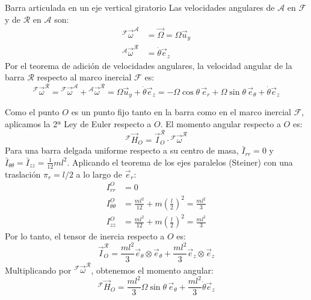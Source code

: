 \begin{solucion}{Barra articulada en un eje vertical giratorio}
Las velocidades angulares de $\mathcal{A}$ en $\mathcal{F}$ y de $\mathcal{R}$ en $\mathcal{A}$ son:
\begin{align}
    {}^{\mathcal{F}}\vec{\omega}^{\mathcal{A}} &= \vec{\Omega} = \Omega\vec{u}_y \\
    {}^{\mathcal{A}}\vec{\omega}^{\mathcal{R}} &= \dot{\theta}\vec{e}_z
\end{align}
Por el teorema de adición de velocidades angulares, la velocidad angular de la barra $\mathcal{R}$ respecto al marco inercial $\mathcal{F}$ es:
\begin{equation}
    {}^{\mathcal{F}}\vec{\omega}^{\mathcal{R}} = {}^{\mathcal{F}}\vec{\omega}^{\mathcal{A}} + {}^{\mathcal{A}}\vec{\omega}^{\mathcal{R}} = \Omega\vec{u}_y + \dot{\theta}\vec{e}_z = -\Omega\cos\theta\,\vec{e}_r + \Omega\sin\theta\,\vec{e}_\theta + \dot{\theta}\vec{e}_z
\end{equation}

Como el punto $O$ es un punto fijo tanto en la barra como en el marco inercial $\mathcal{F}$, aplicamos la 2ª Ley de Euler respecto a $O$. El momento angular respecto a $O$ es:
\begin{equation}
    {}^{\mathcal{F}}\vec{H}_O = \vec{I}_O^{\mathcal{R}} \cdot {}^{\mathcal{F}}\vec{\omega}^{\mathcal{R}}
\end{equation}
Para una barra delgada uniforme respecto a su centro de masa, $\bar{I}_{rr} = 0$ y $\bar{I}_{\theta\theta} = \bar{I}_{zz} = \frac{1}{12}ml^2$. Aplicando el teorema de los ejes paralelos (Steiner) con una traslación $\pi_r = l/2$ a lo largo de $\vec{e}_r$:
\begin{align}
    I_{rr}^O &= 0 \\
    I_{\theta\theta}^O &= \frac{ml^2}{12} + m\left(\frac{l}{2}\right)^2 = \frac{ml^2}{3} \\
    I_{zz}^O &= \frac{ml^2}{12} + m\left(\frac{l}{2}\right)^2 = \frac{ml^2}{3}
\end{align}
Por lo tanto, el tensor de inercia respecto a $O$ es:
\begin{equation}
    \vec{I}_O^{\mathcal{R}} = \frac{ml^2}{3}\vec{e}_\theta \otimes \vec{e}_\theta + \frac{ml^2}{3}\vec{e}_z \otimes \vec{e}_z
\end{equation}
Multiplicando por ${}^{\mathcal{F}}\vec{\omega}^{\mathcal{R}}$, obtenemos el momento angular:
\begin{equation}
    {}^{\mathcal{F}}\vec{H}_O = \frac{ml^2}{3}\Omega\sin\theta\,\vec{e}_\theta + \frac{ml^2}{3}\dot{\theta}\vec{e}_z
\end{equation}


\end{solucion}

